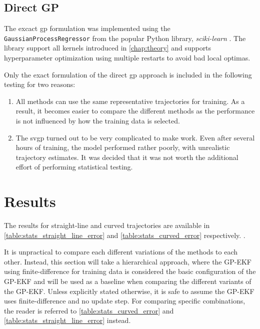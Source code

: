 \subsection{Direct GP}
The excact \acrshort{gp} formulation was implemented using the \texttt{GaussianProcessRegressor} from the popular Python library, \textit{sciki-learn} \cite{scikit-learn}. The library support all kernels introduced in \cref{chap:theory} and supports hyperparameter optimization using multiple restarts to avoid bad local optimas.

Only the exact formulation of the direct \acrshort{gp} approach is included in the following testing for two reasons:
\begin{enumerate}
    \item All methods can use the same representative trajectories for training. As a result, it becomes easier to compare the different methods as the performance is not influenced by how the training data is selected.
    \item The \acrshort{svgp} turned out to be very complicated to make work. Even after several hours of training, the model performed rather poorly, with unrealistic trajectory estimates. It was decided that it was not worth the additional effort of performing statistical testing.
\end{enumerate}

\section{Results}
The results for straight-line and curved trajectories are available in \cref{table:stats_straight_line_error} and \cref{table:stats_curved_error} respectively. .

It is unpractical to compare each different variations of the methods to each other. Instead, this section will take a hierarchical approach, where the GP-EKF using finite-difference for training data is considered the basic configuration of the GP-EKF and will be used as a baseline when comparing the different variants of the GP-EKF. Unless explicitly stated otherwise, it is safe to assume the GP-EKF uses finite-difference and no update step. For comparing specific combinations, the reader is referred to \cref{table:stats_curved_error} and \cref{table:stats_straight_line_error} instead.


